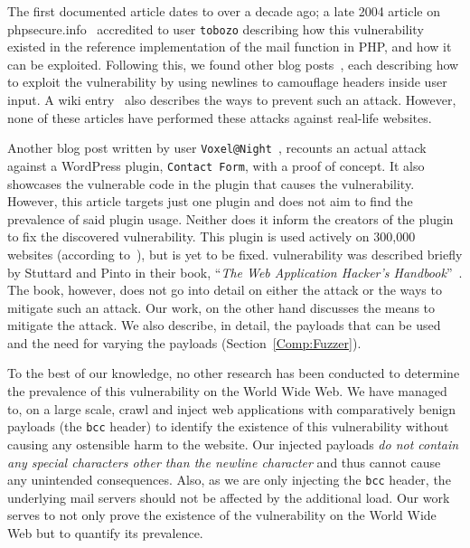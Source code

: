 The first documented article dates to over a decade ago; a late 2004 article on phpsecure.info~\cite{Tobozo} accredited to user \lstinline|tobozo| describing how this vulnerability existed in the reference implementation of the mail function in PHP, and how it can be exploited. Following this, we found other blog posts~\cite{Calin,DK,Injection2,Nicol,Pope}, each describing how to exploit the vulnerability by using newlines to camouflage headers inside user input. A wiki entry~\cite{Injection} also describes the ways to prevent such an attack. However, none of these articles have performed these attacks against real-life websites.

Another blog post written by user \lstinline|Voxel@Night|~\cite{Tendencies2014}, recounts an actual attack against a WordPress plugin, \texttt{Contact Form}, with a proof of concept. It also showcases the vulnerable code in the plugin that causes the vulnerability. However, this article targets just one plugin and does not aim to find the prevalence of said plugin usage. Neither does it inform the creators of the plugin to fix the discovered vulnerability. This plugin is used actively on 300,000 websites (according to~\cite{BestWebSoft2016}), but is yet to be fixed.
\ehi vulnerability was described briefly by Stuttard and Pinto in their book, ``\emph{The Web Application Hacker's Handbook}''~\cite{stuttard2011web}. The book, however, does not go into detail on either the attack or the ways to mitigate such an attack. Our work, on the other hand discusses the means to mitigate the attack. We also describe, in detail, the payloads that can be used and the need for varying the payloads (Section~\ref{Comp:Fuzzer}).

To the best of our knowledge, no other research has been conducted to determine the prevalence of this vulnerability on the World Wide Web. We have managed to, on a large scale, crawl and inject web applications with comparatively benign payloads (the \texttt{bcc} header) to identify the existence of this vulnerability without causing any ostensible harm to the website. Our injected payloads \emph{do not contain any special characters other than the newline character} and thus cannot cause any unintended consequences. Also, as we are only injecting the \texttt{bcc} header, the underlying mail servers should not be affected by the additional load. Our work serves to not only prove the existence of the vulnerability on the World Wide Web but to quantify its prevalence.
